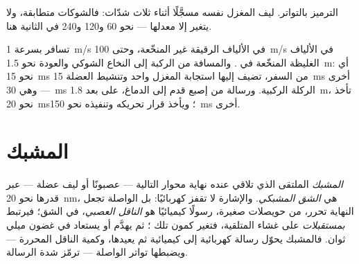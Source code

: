 \begin{omfigure}

{\small الترميز بالتواتر. ليف المغزل نفسه مسجَّلًا أثناء ثلاث شدّات:
فالشوكات متطابقة، ولا يتغير إلا معدلها --- نحو 60 و120 و240 في الثانية
هنا.}
\end{omfigure}

\begin{example}[السرعة]\label{ex:g12:stretch-reflex:speed}
 تسافر بسرعة \qty{1}{m/s} في الألياف الرقيقة غير المنخّعة،
وحتى \qty{100}{m/s} في الألياف الغليظة المنخّعة في . والمسافة
من الركبة إلى النخاع الشوكي والعودة نحو \qty{1.5}{m}: أي نحو
\qty{15}{ms} من السفر، تضيف إليها استجابة المغزل  واحد وتنشيط
العضلة \qty{15}{ms} أخرى --- وهي \qty{30}{ms} الركلة الركبية. ورسالة
من إصبع قدم إلى الدماغ، على بعد \qty{1.8}{m}، تأخذ نحو \qty{20}{ms}؛
ويأخذ قرار تحريكه وتنفيذه نحو \qty{150}{ms} أخرى.
\end{example}

\section{المشبك}

\begin{definition}\label{def:g12:stretch-reflex:synapse}
\emph{المشبك} الملتقى الذي تلاقي عنده نهاية محوار 
 التالية --- عصبونًا أو ليف عضلة --- عبر  قدرها نحو
\qty{20}{nm}، هي \emph{الشق المشبكي}. والإشارة لا تقفز 
كهربائيًا: بل  الواصلة تجعل النهاية تحرر، من حويصلات
صغيرة، رسولًا كيميائيًا هو \emph{الناقل العصبي}، في
الشق؛ فيرتبط \emph{بمستقبلات} على غشاء  المتلقية، فتغير كمون تلك
؛ ثم يهدَّم أو يستعاد في غضون ميلي ثوان. فالمشبك يحوّل رسالة
كهربائية إلى كيميائية ثم يعيدها، وكمية الناقل المحررة --- ويضبطها
تواتر  الواصلة --- ترمّز شدة الرسالة.
\end{definition}

